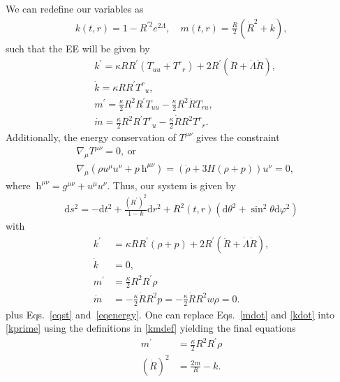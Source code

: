 \documentclass[a4paper,11pt]{article}
\begin{document}
We can redefine our variables as
\begin{align}
	\label{kmdef}
	k(t, r)=1-R^{\prime 2} e^{2 \Lambda}, \quad m(t, r)=\frac{R}{2}\left(\dot{R}^2+k\right)
	,\end{align}
such that the EE will be given by
\begin{align}
	 & k^{\prime} = \kappa RR^{\prime}\left(T_{uu}+T^{r}{}_{r}\right)+2R^{\prime}\left(\ddot{R}+\dot{\Lambda}\dot{R}\right), \\
	 & \dot{k} = \kappa RR^{\prime}T^{r}{}_{u},                                                                              \\
	 & m^{\prime} =\frac{\kappa}{2} R^{2}R^{\prime}T_{uu}-\frac{\kappa}{2} R^{2}\dot{R}T_{ru},                               \\
	 & \dot{m} =\frac{\kappa}{2} R^{2}R^{\prime}T^{r}{}_{u}-\frac{\kappa}{2}\dot{R}R^{2}T^{r}{}_{r}
	.\end{align}
Additionally, the energy conservation of $T^{\mu\nu}$ gives the constraint
\begin{align}
	\label{eqenergy}
	 & \nabla_{\mu}T^{\mu\nu}=0,~\text{or}\nonumber                                                           \\
	 & \nabla_\mu(\rho u^\mu u^\nu+p\mathrm{~h}^{\mu\nu})=\left(\dot{\rho}+3H(\rho+p)\right)u^\nu=0
	,\end{align}
where $\mathrm{~h}^{\mu\nu} = g^{\mu\nu} + u^\mu u^\nu $.
Thus, our system is given by
\begin{align}
	\label{metricgen}
	\mathrm{d} s^2=-\mathrm{d} t^2+\frac{(R^\prime)^{2}}{1 - k} \mathrm{d} r^2+R^2(t, r)\left(\mathrm{d} \theta^2+\sin ^2 \theta \mathrm{d} \varphi^2\right)
\end{align}
with
\begin{align}
	\label{kprime}
	k^{\prime} & =\kappa RR^{\prime}\left(\rho+p\right)+2R^{\prime}\left(\ddot{R}+\dot{\Lambda}\dot{R}\right), \\
	\label{kdot}
	\dot{k}    & = 0,                                                                                          \\
	m^{\prime} & =\frac{\kappa}{2} R^{2}R^{\prime}\rho                                                         \\
	\label{mdot}
	\dot{m}    & =-\frac{\kappa}{2}\dot{R}R^{2}p = -\frac{\kappa}{2}\dot{R}R^{2} w\rho = 0.
\end{align}
plus Eqs.~\eqref{eqst} and~\eqref{eqenergy}. One can replace Eqs.~\eqref{mdot} and
\eqref{kdot} into \eqref{kprime} using the definitions in \eqref{kmdef} yielding the
final equations
\begin{align}
	\label{mprime}
	m^{\prime}  & =\frac{\kappa}{2} R^{2}R^{\prime}\rho \\
	\label{rdot}
	(\dot{R})^2 & = \frac{2m}{R}-k
	.\end{align}
\end{document}
